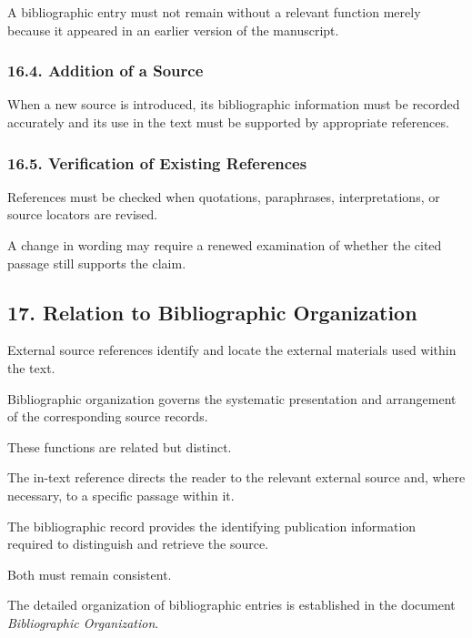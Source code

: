 A bibliographic entry must
not remain without a relevant
function merely because
it appeared in an earlier
version of the manuscript.

\subsubsection*{16.4. Addition of a Source}

When a new source is introduced,
its bibliographic information
must be recorded accurately
and its use in the text
must be supported by
appropriate references.

\subsubsection*{16.5. Verification of Existing References}

References must be checked
when quotations, paraphrases,
interpretations, or source
locators are revised.

A change in wording may
require a renewed examination
of whether the cited passage
still supports the claim.


\subsection*{17. Relation to Bibliographic
Organization}

External source references
identify and locate the
external materials used
within the text.

Bibliographic organization
governs the systematic
presentation and arrangement
of the corresponding source
records.

These functions are related
but distinct.

The in-text reference directs
the reader to the relevant
external source and, where
necessary, to a specific
passage within it.

The bibliographic record
provides the identifying
publication information
required to distinguish
and retrieve the source.

Both must remain consistent.

The detailed organization
of bibliographic entries
is established in the
document \textit{Bibliographic
Organization}.


